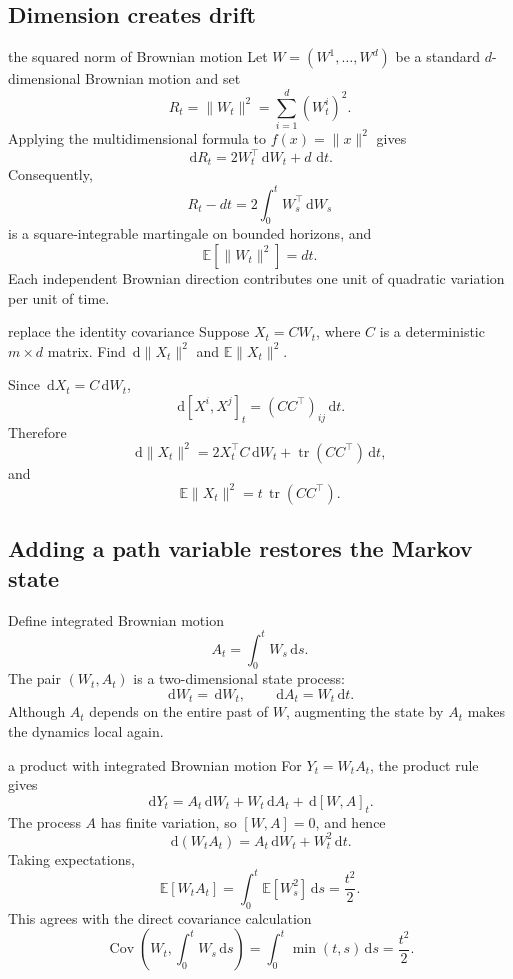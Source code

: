 \documentclass[10pt]{article}
\newcommand{\E}{\mathbb E}
\newcommand{\1}{\mathbf 1}
\newcommand{\dd}{\,\mathrm d}
\DeclareMathOperator{\Cov}{Cov}
\theoremstyle{definition}
\begin{document}
\subsection{Dimension creates drift}

\begin{boardexample}{the squared norm of Brownian motion}
Let \(W=(W^1,\ldots,W^d)\) be a standard \(d\)-dimensional Brownian
motion and set
\[
R_t=\|W_t\|^2=\sum_{i=1}^d(W_t^i)^2.
\]
Applying the multidimensional formula to \(f(x)=\|x\|^2\) gives
\[
\boxed{
\dd R_t=2W_t^\top\dd W_t+d\,\dd t.}
\]
Consequently,
\[
R_t-dt=2\int_0^tW_s^\top\dd W_s
\]
is a square-integrable martingale on bounded horizons, and
\[
\E[\|W_t\|^2]=dt.
\]
Each independent Brownian direction contributes one unit of quadratic
variation per unit of time.
\end{boardexample}

\begin{studentexercise}{replace the identity covariance}
Suppose \(X_t=CW_t\), where \(C\) is a deterministic \(m\times d\) matrix.
Find \(\dd\|X_t\|^2\) and \(\E\|X_t\|^2\).
\end{studentexercise}
\begin{shortsolution}
Since \(\dd X_t=C\dd W_t\),
\[
\dd[X^i,X^j]_t=(CC^\top)_{ij}\dd t.
\]
Therefore
\[
\dd\|X_t\|^2
=2X_t^\top C\dd W_t+\operatorname{tr}(CC^\top)\dd t,
\]
and
\[
\boxed{\E\|X_t\|^2=t\,\operatorname{tr}(CC^\top).}
\]
\end{shortsolution}

\subsection{Adding a path variable restores the Markov state}

Define integrated Brownian motion
\[
A_t=\int_0^tW_s\dd s.
\]
The pair \((W_t,A_t)\) is a two-dimensional state process:
\[
\dd W_t=\dd W_t,\qquad \dd A_t=W_t\dd t.
\]
Although \(A_t\) depends on the entire past of \(W\), augmenting the state by
\(A_t\) makes the dynamics local again.

\begin{boardexample}{a product with integrated Brownian motion}
For \(Y_t=W_tA_t\), the product rule gives
\[
\dd Y_t
=A_t\dd W_t+W_t\dd A_t+\dd[W,A]_t.
\]
The process \(A\) has finite variation, so \([W,A]=0\), and hence
\[
\boxed{\dd(W_tA_t)=A_t\dd W_t+W_t^2\dd t.}
\]
Taking expectations,
\[
\boxed{
\E[W_tA_t]
=\int_0^t\E[W_s^2]\dd s
=\frac{t^2}{2}.}
\]
This agrees with the direct covariance calculation
\[
\Cov\left(W_t,\int_0^tW_s\dd s\right)
=\int_0^t\min(t,s)\dd s=\frac{t^2}{2}.
\]
\end{boardexample}
\end{document}
